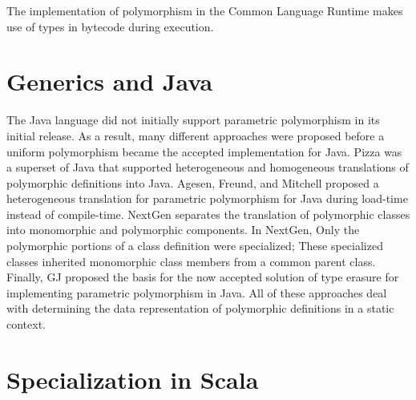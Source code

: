 The implementation of polymorphism in the Common Language Runtime\cite{clr:overview}\cite{clr:spec} makes use of types in bytecode during execution.

\section{Generics and Java}
The Java language did not initially support parametric polymorphism in its initial release.
As a result, many different approaches were proposed before a uniform polymorphism became the accepted implementation for Java.
Pizza\cite{java:pizza} was a superset of Java that supported heterogeneous and homogeneous translations of polymorphic definitions into Java.
Agesen, Freund, and Mitchell proposed a heterogeneous translation for parametric polymorphism for Java during load-time instead of compile-time\cite{java:agesen-type-params}.
NextGen\cite{java:nextgen} separates the translation of polymorphic classes into monomorphic and polymorphic components.
In NextGen, Only the polymorphic portions of a class definition were specialized; These specialized classes inherited monomorphic class members from a common parent class.
Finally, GJ\cite{java:gj} proposed the basis for the now accepted solution of type erasure for implementing parametric polymorphism in Java.
All of these approaches deal with determining the data representation of polymorphic definitions in a static context.

\section{Specialization in Scala}

